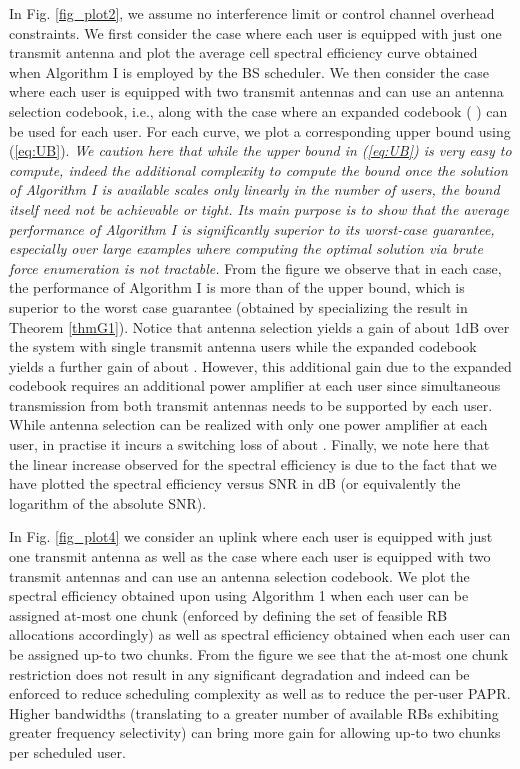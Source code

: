 \documentclass[11pt] {article}
\begin{document}
   In Fig. \ref{fig_plot2}, we assume no interference limit or control channel overhead constraints. We first  consider the case where each user is equipped with just one transmit antenna
    and plot the average cell spectral efficiency curve  obtained   when Algorithm I is employed by the BS scheduler. We then consider the case where
    each user is equipped with two transmit antennas and can use an antenna  selection codebook, i.e.,  along with the case where an expanded codebook ( \cite{3gpp}) can be used for each user. For each curve, we plot a corresponding upper bound using (\ref{eq:UB}).  {\em We caution here that while the upper bound in (\ref{eq:UB}) is very easy to compute, indeed the additional complexity to compute the bound once the solution of Algorithm I is available scales only linearly in the number of users, the bound itself need not be achievable or tight. Its main purpose is to show that the average performance of Algorithm I is significantly superior to its worst-case guarantee, especially over large examples where computing the optimal solution via brute force enumeration is not tractable.} From the figure we observe that in each case, the performance of Algorithm I  is more than  of the  upper bound, which is   superior to the worst case guarantee  (obtained by specializing the result in Theorem \ref{thmG1}). Notice that  antenna selection yields a gain of about 1dB over the system with single transmit antenna users while the expanded codebook yields a further gain of about . However, this additional gain due to the expanded codebook requires an additional power amplifier at each user since simultaneous transmission from both transmit antennas needs to be supported by each user. While antenna selection can be realized with only one power amplifier at each user, in practise it  incurs a switching loss of about . Finally, we note here that the linear increase observed for the spectral efficiency is due to the fact that we have plotted the spectral efficiency versus SNR in dB (or equivalently the logarithm of the absolute SNR).


 In Fig. \ref{fig_plot4} we consider an uplink where each user is equipped with just one transmit antenna
    as well as the case where
    each user is equipped with two transmit antennas and can use an antenna  selection codebook.  We   plot the spectral efficiency obtained upon using Algorithm 1 when each user can be assigned at-most one chunk (enforced by defining the set of feasible RB allocations accordingly) as well as spectral efficiency obtained when each user can be assigned up-to two chunks. From the figure we see that the at-most one chunk restriction does not result in any significant degradation and indeed can be enforced to reduce scheduling complexity as well as to reduce the per-user PAPR. Higher bandwidths (translating to a greater number of available RBs exhibiting greater frequency selectivity) can bring more gain for allowing up-to two chunks per scheduled user.
\end{document}
